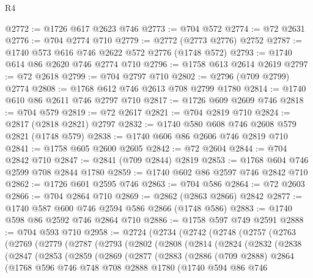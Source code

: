 \begin{lexlean}{R4}
\begin{coremodule}
@2772 := @1726 @617 @2623 @746
@2773 := @704 @572
@2774 := @72 @2631
@2776 := @704 @2774 @710
@2779 := @2772 (@2773 @2776) @2752
@2787 := @1740 @573 @616 @746 @2622 @572 @2776 (@1748 @572)
@2793 := @1740 @614 @86 @2620 @746 @2774 @710
@2796 := @1758 @613 @2614 @2619
@2797 := @72 @2618
@2799 := @704 @2797 @710
@2802 := @2796 (@709 @2799) @2774
@2808 := @1768 @612 @746 @2613 @708 @2799 @1780
@2814 := @1740 @610 @86 @2611 @746 @2797 @710
@2817 := @1726 @609 @2609 @746
@2818 := @704 @579
@2819 := @72 @2617
@2821 := @704 @2819 @710
@2824 := @2817 (@2818 @2821) @2797
@2832 := @1740 @580 @608 @746 @2608 @579 @2821 (@1748 @579)
@2838 := @1740 @606 @86 @2606 @746 @2819 @710
@2841 := @1758 @605 @2600 @2605
@2842 := @72 @2604
@2844 := @704 @2842 @710
@2847 := @2841 (@709 @2844) @2819
@2853 := @1768 @604 @746 @2599 @708 @2844 @1780
@2859 := @1740 @602 @86 @2597 @746 @2842 @710
@2862 := @1726 @601 @2595 @746
@2863 := @704 @586
@2864 := @72 @2603
@2866 := @704 @2864 @710
@2869 := @2862 (@2863 @2866) @2842
@2877 := @1740 @587 @600 @746 @2594 @586 @2866 (@1748 @586)
@2883 := @1740 @598 @86 @2592 @746 @2864 @710
@2886 := @1758 @597 @749 @2591
@2888 := @704 @593 @710
@2958 := @2724
    (@2734
      (@2742
        (@2748
          (@2757
            (@2763
              (@2769
                (@2779
                  (@2787
                    (@2793
                      (@2802
                        (@2808
                          (@2814
                            (@2824
                              (@2832
                                (@2838
                                  (@2847
                                    (@2853
                                      (@2859
                                        (@2869
                                          (@2877
                                            (@2883
                                              (@2886
                                                (@709 @2888)
                                                @2864
                                                (@1768
                                                  @596
                                                  @746
                                                  @748
                                                  @708
                                                  @2888
                                                  @1780
                                                  (@1740
                                                    @594
                                                    @86
                                                    @746

\end{coremodule}
\end{lexlean}
